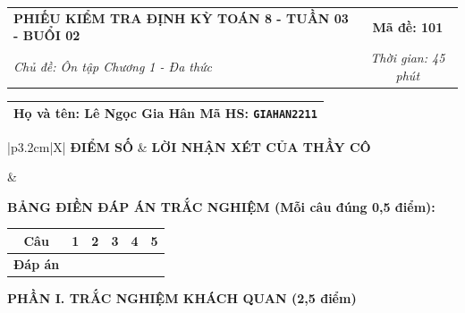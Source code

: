 \documentclass[12pt,a4paper]{article}
\begin{document}
\newpage



\noindent
\begin{tabularx}{\linewidth}{|X|c|}
\hline
\textbf{PHIẾU KIỂM TRA ĐỊNH KỲ TOÁN 8 - TUẦN 03 - BUỔI 02} & \textbf{Mã đề: 101} \\
\textit{Chủ đề: Ôn tập Chương 1 - Đa thức} & \textit{Thời gian: 45 phút} \\
\hline
\end{tabularx}

\vspace{1mm}

\noindent
\begin{tabularx}{\linewidth}{|X|}
\hline
\rule[-2mm]{0pt}{7.5mm}\textbf{Họ và tên:} \textbf{\large Lê Ngọc Gia Hân} \hfill \textbf{Mã HS:} \texttt{GIAHAN2211} \quad \\
\hline
\end{tabularx}

\vspace{1mm}

\noindent
\begin{tabularx}{\linewidth}{|p{3.2cm}|X|}
\hline
\centering\textbf{ĐIỂM SỐ} & \centering\textbf{LỜI NHẬN XÉT CỦA THẦY CÔ} \tabularnewline
\hline
\rule{0pt}{1.3cm} & \tabularnewline
\hline
\end{tabularx}

\vspace{1.2mm}

\noindent\textbf{BẢNG ĐIỀN ĐÁP ÁN TRẮC NGHIỆM (Mỗi câu đúng 0,5 điểm):}
\vspace{0.8mm}

\noindent
\renewcommand{\arraystretch}{1.35}
\begin{tabularx}{\linewidth}{|c|*{5}{>{\centering\arraybackslash}X|}}
\hline
\textbf{Câu} & \textbf{1} & \textbf{2} & \textbf{3} & \textbf{4} & \textbf{5} \\
\hline
\textbf{Đáp án} & & & & & \\
\hline
\end{tabularx}
\renewcommand{\arraystretch}{1.0}

\vspace{1.5mm}

\noindent\textbf{\large PHẦN I. TRẮC NGHIỆM KHÁCH QUAN (2,5 điểm)}
\vspace{1mm}
\end{document}
